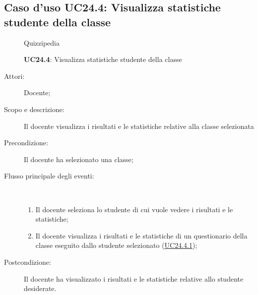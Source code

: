 \subsection{Caso d'uso UC24.4: Visualizza statistiche studente della classe}
\begin{figure}[H]
	\centering
	\begin{resizedtikzpicture}{\textwidth}
		\begin{umlsystem}[x=0, fill=lightgray!20]{Quizzipedia}
		\end{umlsystem}
	\end{resizedtikzpicture}
	\caption{\textbf{UC24.4}: Visualizza statistiche studente della classe}
	\label{UC24.4}
\end{figure}
\begin{description}
	\item[Attori:] Docente;
	\item[Scopo e descrizione:] Il docente visualizza i risultati e le statistiche relative alla classe selezionata
	\item[Precondizione:] Il docente ha selezionato una classe;
	
	\item[Flusso principale degli eventi:] \ 
	\begin{enumerate}
		\item Il docente seleziona lo studente di cui vuole vedere i risultati e le statistiche;
		\item Il docente visualizza i risultati e le statistiche di un questionario della classe eseguito dallo studente selezionato (\hyperlink{UC24.4.1}{UC24.4.1});
		
	\end{enumerate}
	\item[Postcondizione:] Il docente ha visualizzato i risultati e le statistiche relative allo studente desiderate.
\end{description}
\hypertarget{UC24.4.1}{}
